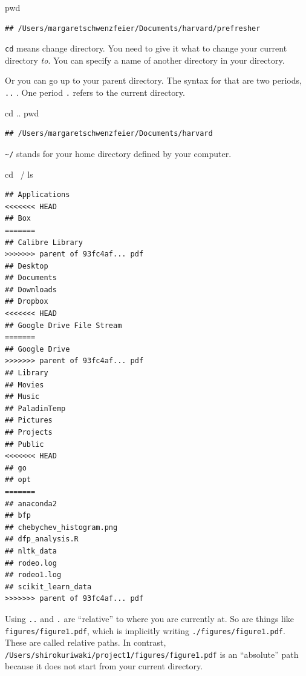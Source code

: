 \documentclass[]{book}
\newenvironment{Shaded}{\begin{snugshade}}{\end{snugshade}}
\newcommand{\BuiltInTok}[1]{#1}
\newcommand{\FunctionTok}[1]{\textcolor[rgb]{0.00,0.00,0.00}{#1}}
\newcommand{\NormalTok}[1]{#1}
\theoremstyle{definition}
\theoremstyle{definition}
\theoremstyle{definition}
\theoremstyle{remark}
\begin{document}
\begin{Shaded}
\begin{Highlighting}[]
\begin{Shaded}
\begin{Highlighting}[]
\begin{Shaded}
\begin{Highlighting}[]
\begin{Shaded}
\begin{Highlighting}[]
\BuiltInTok{pwd}
\end{Highlighting}
\end{Shaded}

\begin{verbatim}
## /Users/margaretschwenzfeier/Documents/harvard/prefresher
\end{verbatim}

\texttt{cd} means change directory. You need to give it what to change your current directory \emph{to}. You can specify a name of another directory in your directory.

Or you can go up to your parent directory. The syntax for that are two periods, \texttt{..} . One period \texttt{.} refers to the current directory.

\begin{Shaded}
\begin{Highlighting}[]
\BuiltInTok{cd}\NormalTok{ ..}
\BuiltInTok{pwd}
\end{Highlighting}
\end{Shaded}

\begin{verbatim}
## /Users/margaretschwenzfeier/Documents/harvard
\end{verbatim}

\texttt{\textasciitilde{}/} stands for your home directory defined by your computer.

\begin{Shaded}
\begin{Highlighting}[]
\BuiltInTok{cd}\NormalTok{ ~/}
\FunctionTok{ls}
\end{Highlighting}
\end{Shaded}

\begin{verbatim}
## Applications
<<<<<<< HEAD
## Box
=======
## Calibre Library
>>>>>>> parent of 93fc4af... pdf
## Desktop
## Documents
## Downloads
## Dropbox
<<<<<<< HEAD
## Google Drive File Stream
=======
## Google Drive
>>>>>>> parent of 93fc4af... pdf
## Library
## Movies
## Music
## PaladinTemp
## Pictures
## Projects
## Public
<<<<<<< HEAD
## go
## opt
=======
## anaconda2
## bfp
## chebychev_histogram.png
## dfp_analysis.R
## nltk_data
## rodeo.log
## rodeo1.log
## scikit_learn_data
>>>>>>> parent of 93fc4af... pdf
\end{verbatim}

Using \texttt{..} and \texttt{.} are ``relative'' to where you are currently at. So are things like \texttt{figures/figure1.pdf}, which is implicitly writing \texttt{./figures/figure1.pdf}. These are called relative paths. In contrast, \texttt{/Users/shirokuriwaki/project1/figures/figure1.pdf} is an ``absolute'' path because it does not start from your current directory.


\end{Highlighting}
\end{Shaded}
\end{Highlighting}
\end{Shaded}
\end{Highlighting}
\end{Shaded}
\end{document}
